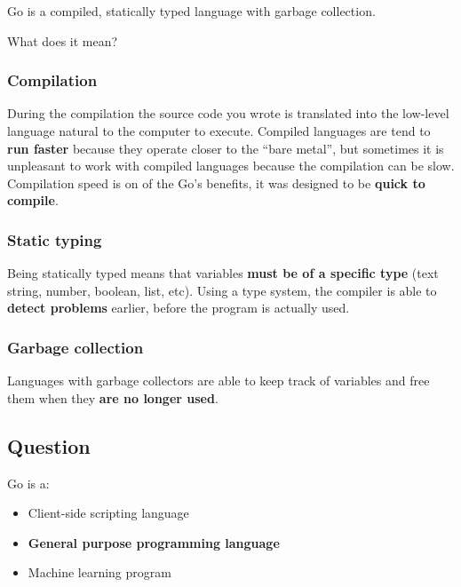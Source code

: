 \documentclass[]{book}
\providecommand{\tightlist}{%
  \setlength{\itemsep}{0pt}\setlength{\parskip}{0pt}}
\begin{document}
Go is a compiled, statically typed language with garbage collection.

What does it mean?

\hypertarget{compilation}{%
\subsubsection*{Compilation}\label{compilation}}

During the compilation the source code you wrote is translated into the
low-level language natural to the computer to execute. Compiled languages are
tend to \textbf{run faster} because they operate closer to the ``bare metal'', but
sometimes it is unpleasant to work with compiled languages because the
compilation can be slow. Compilation speed is on of the Go's benefits, it was
designed to be \textbf{quick to compile}.

\hypertarget{static-typing}{%
\subsubsection*{Static typing}\label{static-typing}}

Being statically typed means that variables \textbf{must be of a specific type}
(text string, number, boolean, list, etc). Using a type system, the compiler is
able to \textbf{detect problems} earlier, before the program is actually used.

\hypertarget{garbage-collection}{%
\subsubsection*{Garbage collection}\label{garbage-collection}}

Languages with garbage collectors are able to keep track of variables and free
them when they \textbf{are no longer used}.

\hypertarget{question}{%
\subsection*{Question}\label{question}}

Go is a:

\begin{itemize}
\tightlist
\item
  Client-side scripting language
\item
  \textbf{General purpose programming language}
\item
  Machine learning program
\end{itemize}
\end{document}
